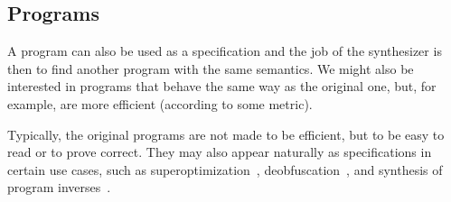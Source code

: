 \subsection{Programs}
\label{sec:programs}

A program can also be used as a specification and the job of the synthesizer is
then to find another program with the same semantics.
We might also be interested in programs that behave the same way as the original
one, but, for example, are more efficient (according to some metric).

Typically, the original programs are not made to be efficient, but to be easy to
read or to prove correct.
They may also appear naturally as specifications in certain use cases, such as
superoptimization~\cite{Phothilimthana:2016:SUS},
deobfuscation~\cite{Jha:oracle:2010}, and
synthesis of program inverses~\cite{Srivastava:2011:PIS}.
